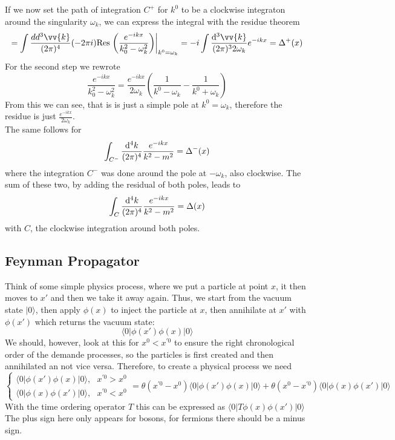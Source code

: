 \documentclass{include/thesisclass}
\newcommand{\rk}{\rangle}
\newcommand{\lk}{\langle}
\newcommand{\dd}{{\rm d}}
\begin{document}
If we now set the path of integration $C^+$ for $k^0$ to be a clockwise integraton around the singularity $\omega_k$, we can express the integral with the residue theorem
\[ = \int \frac{dd^3 \vv{k}}{(2\pi)^4} (-2\pi i) {\rm Res}\left.\left( \frac{e^{-ikx}}{k_0^2-\omega_k^2}\right)\right|_{k^0 = \omega_k} = -i \int \frac{\dd^3 \vv{k}}{(2\pi)^32\omega_k} e^{-ikx} = \Delta^+(x)\]
For the second step we rewrote 
\[\frac{e^{-ikx}}{k_0^2-\omega_k^2} = \frac{e^{-ikx}}{2\omega_k}\left( \frac{1}{k^0-\omega_k}-\frac{1}{k^0+\omega_k}\right)\]
From this we can see, that is is just a simple pole at $k^0 = \omega_k$, therefore the residue is just $\frac{e^{-ikx}}{2\omega_k}$.\\
The same follows for 
\[ \int_{C^-}\frac{\dd^4 k}{(2\pi)^4}\frac{e^{-ikx}}{k^2-m^2} = \Delta^-(x)\]
where the integration $C^-$ was done around the pole at $-\omega_k$, also clockwise.
The sum of these two, by adding the residual of both poles, leads to
\[ \int_C \frac{\dd^4k}{(2\pi)^4} \frac{e^{-ikx}}{k^2-m^2} = \Delta(x)\]
with $C$, the clockwise integration around both poles.

\subsection{Feynman Propagator}
Think of some simple physics process, where we put a particle at point $x$, it then moves to $x'$ and then we take it away again.
Thus, we start from the vacuum state $|0\rk$, then apply $\phi(x)$ to inject the particle at $x$, then annihilate at $x'$ with $\phi(x')$ which returns the vacuum state:
\[\lk 0 | \phi(x') \phi(x) | 0\rk\]
We should, however, look at this for $x^0 < x^{\prime 0}$ to ensure the right chronological order of the demande processes, so the particles is first created and then annihilated an not vice versa. Therefore, to create a physical process we need
\[ \begin{cases} \lk 0 | \phi(x') \phi(x) | 0 \rk, ~~~x^{\prime 0} > x^0\\
\lk 0|\phi(x) \phi(x') | 0 \rk, ~~~ x^{\prime 0} < x^0 
\end{cases} = \theta(x^{\prime 0} -x^0) \lk 0 | \phi(x') \phi(x) | 0 \rk + \theta(x^0 - x^{\prime 0}) \lk 0 | \phi(x) \phi(x') | 0 \rk\]
With the time ordering operator $T$ this can be expressed as $\lk 0 | T\phi(x) \phi(x') | 0 \rk$
The plus sign here only appears for bosons, for fermions there should be a minus sign.
\end{document}
